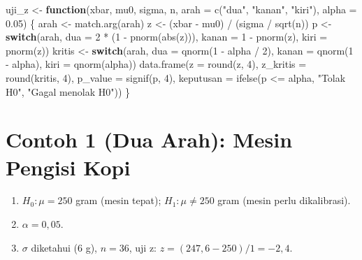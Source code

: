 \documentclass[
  indonesian,
  letterpaper,
]{book}
\newenvironment{Shaded}{\begin{snugshade}}{\end{snugshade}}
\newcommand{\AttributeTok}[1]{\textcolor[rgb]{0.40,0.45,0.13}{#1}}
\newcommand{\ControlFlowTok}[1]{\textcolor[rgb]{0.00,0.23,0.31}{\textbf{#1}}}
\newcommand{\DecValTok}[1]{\textcolor[rgb]{0.68,0.00,0.00}{#1}}
\newcommand{\FloatTok}[1]{\textcolor[rgb]{0.68,0.00,0.00}{#1}}
\newcommand{\FunctionTok}[1]{\textcolor[rgb]{0.28,0.35,0.67}{#1}}
\newcommand{\NormalTok}[1]{\textcolor[rgb]{0.00,0.23,0.31}{#1}}
\newcommand{\OtherTok}[1]{\textcolor[rgb]{0.00,0.23,0.31}{#1}}
\newcommand{\SpecialCharTok}[1]{\textcolor[rgb]{0.37,0.37,0.37}{#1}}
\newcommand{\StringTok}[1]{\textcolor[rgb]{0.13,0.47,0.30}{#1}}
\providecommand{\tightlist}{%
  \setlength{\itemsep}{0pt}\setlength{\parskip}{0pt}}
\begin{document}
\begin{Shaded}
\begin{Highlighting}[]
\NormalTok{uji\_z }\OtherTok{\textless{}{-}} \ControlFlowTok{function}\NormalTok{(xbar, mu0, sigma, n, }\AttributeTok{arah =} \FunctionTok{c}\NormalTok{(}\StringTok{"dua"}\NormalTok{, }\StringTok{"kanan"}\NormalTok{, }\StringTok{"kiri"}\NormalTok{),}
                  \AttributeTok{alpha =} \FloatTok{0.05}\NormalTok{) \{}
\NormalTok{  arah }\OtherTok{\textless{}{-}} \FunctionTok{match.arg}\NormalTok{(arah)}
\NormalTok{  z }\OtherTok{\textless{}{-}}\NormalTok{ (xbar }\SpecialCharTok{{-}}\NormalTok{ mu0) }\SpecialCharTok{/}\NormalTok{ (sigma }\SpecialCharTok{/} \FunctionTok{sqrt}\NormalTok{(n))}
\NormalTok{  p }\OtherTok{\textless{}{-}} \ControlFlowTok{switch}\NormalTok{(arah, }\AttributeTok{dua =} \DecValTok{2} \SpecialCharTok{*}\NormalTok{ (}\DecValTok{1} \SpecialCharTok{{-}} \FunctionTok{pnorm}\NormalTok{(}\FunctionTok{abs}\NormalTok{(z))), }\AttributeTok{kanan =} \DecValTok{1} \SpecialCharTok{{-}} \FunctionTok{pnorm}\NormalTok{(z),}
              \AttributeTok{kiri =} \FunctionTok{pnorm}\NormalTok{(z))}
\NormalTok{  kritis }\OtherTok{\textless{}{-}} \ControlFlowTok{switch}\NormalTok{(arah, }\AttributeTok{dua =} \FunctionTok{qnorm}\NormalTok{(}\DecValTok{1} \SpecialCharTok{{-}}\NormalTok{ alpha }\SpecialCharTok{/} \DecValTok{2}\NormalTok{), }\AttributeTok{kanan =} \FunctionTok{qnorm}\NormalTok{(}\DecValTok{1} \SpecialCharTok{{-}}\NormalTok{ alpha),}
                   \AttributeTok{kiri =} \FunctionTok{qnorm}\NormalTok{(alpha))}
  \FunctionTok{data.frame}\NormalTok{(}\AttributeTok{z =} \FunctionTok{round}\NormalTok{(z, }\DecValTok{4}\NormalTok{), }\AttributeTok{z\_kritis =} \FunctionTok{round}\NormalTok{(kritis, }\DecValTok{4}\NormalTok{), }\AttributeTok{p\_value =} \FunctionTok{signif}\NormalTok{(p, }\DecValTok{4}\NormalTok{),}
             \AttributeTok{keputusan =} \FunctionTok{ifelse}\NormalTok{(p }\SpecialCharTok{\textless{}=}\NormalTok{ alpha, }\StringTok{"Tolak H0"}\NormalTok{, }\StringTok{"Gagal menolak H0"}\NormalTok{))}
\NormalTok{\}}
\end{Highlighting}
\end{Shaded}

\section{Contoh 1 (Dua Arah): Mesin Pengisi
Kopi}\label{contoh-1-dua-arah-mesin-pengisi-kopi}

\begin{enumerate}
\def\labelenumi{\arabic{enumi}.}
\tightlist
\item
  \(H_0: \mu = 250\) gram (mesin tepat); \(H_1: \mu \neq 250\) gram
  (mesin perlu dikalibrasi).
\item
  \(\alpha = 0{,}05\).
\item
  \(\sigma\) diketahui (6 g), \(n = 36\), uji z:
  \(z = (247{,}6 - 250)/1 = -2{,}4\).
\end{enumerate}
\end{document}

